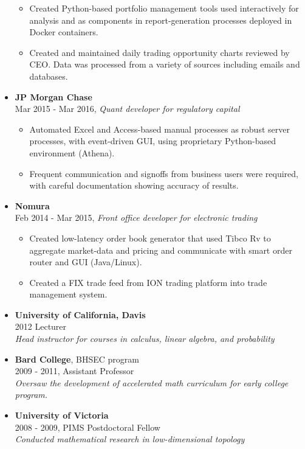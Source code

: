 \documentclass[margin]{res}
\def\tightlist{}
\begin{document}
\begin{resume}
\begin{itemize}
  \begin{itemize}
  \tightlist
  \item
    Created Python-based portfolio management tools used interactively
    for analysis and as components in report-generation processes
    deployed in Docker containers.
  \item
    Created and maintained daily trading opportunity charts reviewed by
    CEO. Data was processed from a variety of sources including emails
    and databases.
  \end{itemize}
\item
  \textbf{JP Morgan Chase}\\
  Mar 2015 - Mar 2016, \emph{Quant developer for regulatory capital}

  \begin{itemize}
  \tightlist
  \item
    Automated Excel and Access-based manual processes as robust server
    processes, with event-driven GUI, using proprietary Python-based
    environment (Athena).
  \item
    Frequent communication and signoffs from business users were
    required, with careful documentation showing accuracy of results.
  \end{itemize}
\item
  \textbf{Nomura}\\
  Feb 2014 - Mar 2015, \emph{Front office developer for electronic
  trading}

  \begin{itemize}
  \tightlist
  \item
    Created low-latency order book generator that used Tibco Rv to
    aggregate market-data and pricing and communicate with smart order
    router and GUI (Java/Linux).
  \item
    Created a FIX trade feed from ION trading platform into trade
    management system.
  \end{itemize}
\item
  \textbf{University of California, Davis}\\
  2012 Lecturer\\
  \emph{Head instructor for courses in calculus, linear algebra, and
  probability}
\item
  \textbf{Bard College}, BHSEC program\\
  2009 - 2011, Assistant Professor\\
  \emph{Oversaw the development of accelerated math curriculum for early
  college program.}
\item
  \textbf{University of Victoria}\\
  2008 - 2009, PIMS Postdoctoral Fellow\\
  \emph{Conducted mathematical research in low-dimensional topology}
\end{itemize}


\end{resume}
\end{document}
